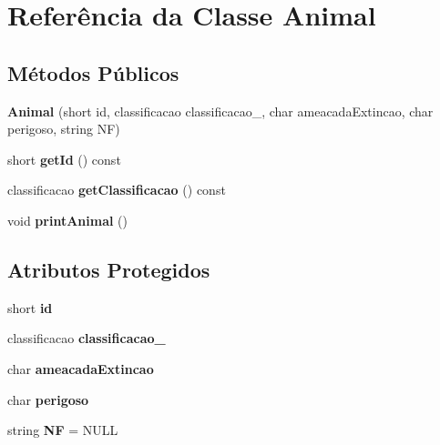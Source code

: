\hypertarget{classAnimal}{}\section{Referência da Classe Animal}
\label{classAnimal}
\subsection*{Métodos Públicos}
\begin{DoxyCompactItemize}
\item 
\mbox{\label{classAnimal_afab1f7fd88529495bca5d619a6b51108}} 
{\bfseries Animal} (short id, classificacao classificacao\+\_\+, char ameacada\+Extincao, char perigoso, string NF)
\item 
\mbox{\label{classAnimal_a3af52b4833e50de5375d9311e9adf686}} 
short {\bfseries get\+Id} () const
\item 
\mbox{\label{classAnimal_adcfa281fdf17903c28d8a8dd1ff703ef}} 
classificacao {\bfseries get\+Classificacao} () const
\item 
\mbox{\label{classAnimal_a9654ef404c34ef6cba5a71c8f4b27b3a}} 
void {\bfseries print\+Animal} ()
\end{DoxyCompactItemize}
\subsection*{Atributos Protegidos}
\begin{DoxyCompactItemize}
\item 
\mbox{\label{classAnimal_acb56069a72c1d256834968efc112072e}} 
short {\bfseries id}
\item 
\mbox{\label{classAnimal_a802ef246d655a812ba406cdf652f5bc1}} 
classificacao {\bfseries classificacao\+\_\+}
\item 
\mbox{\label{classAnimal_aeb8c79818ae84e0ac2fc7ab8761e7dc1}} 
char {\bfseries ameacada\+Extincao}
\item 
\mbox{\label{classAnimal_a591bb1c49f5d9abc6961497477e85f95}} 
char {\bfseries perigoso}
\item 
\mbox{\label{classAnimal_aaac3d95570d4030dcb39a4c08dbbf94e}} 
string {\bfseries NF} = N\+U\+LL
\end{DoxyCompactItemize}
